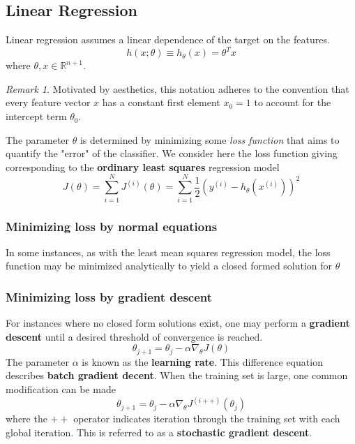 \documentclass{article}
\theoremstyle{definition}
\theoremstyle{remark}
\newtheorem*{remark}{Remark}
\begin{document}
\subsection{Linear Regression}
Linear regression assumes a linear dependence of the target on the features. 
\begin{equation}
    \label{eqn: linear-regression}
    h(x;\theta) \equiv h_{\theta}(x) = \theta^{T}x 
\end{equation}
where $\theta, x \in \mathbb{R}^{n+1}$.
\begin{remark}
Motivated by aesthetics, this notation adheres to the convention that every feature vector $x$ has a constant first element $x_{0}=1$ to account for the intercept term $\theta_{0}$.
\end{remark}
The parameter $\theta$ is determined by minimizing some \textit{loss function} that aims to quantify the "error" of the classifier.
We consider here the loss function giving corresponding to the \textbf{ordinary least squares} regression model
\begin{equation}
    \label{eqn: loss-function}
    J(\theta) = \sum_{i=1}^{N}J^{(i)}(\theta) =  \sum_{i=1}^{N}\frac{1}{2}\left(y^{(i)} - h_{\theta}(x^{(i)})\right)^{2}
\end{equation}
\subsubsection{Minimizing loss by normal equations}
In some instances, as with the least mean squares regression model, the loss function may be minimized analytically to yield a closed formed solution for $\theta$


\subsubsection{Minimizing loss by gradient descent}
For instances where no closed form solutions exist, one may perform a \textbf{gradient descent} until a desired threshold of convergence is reached.
\begin{equation}
    \theta_{j+1} = \theta_{j} - \alpha \nabla_{\theta}J(\theta)
\end{equation}
The parameter $\alpha$ is known as the \textbf{learning rate}.
This difference equation describes \textbf{batch gradient decent}.
When the training set is large, one common modification can be made
\begin{equation}
    \theta_{j+1} = \theta_{j} - \alpha \nabla_{\theta} J^{(i++)}(\theta_{j})
\end{equation}
where the $++$ operator indicates iteration through the training set with each global iteration. This is referred to as a \textbf{stochastic gradient descent}.
\end{document}
